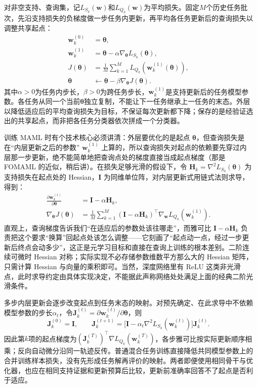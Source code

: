 对非空支持、查询集，记$L_{S_k}(\bm w)$和$L_{Q_k}(\bm w)$为平均损失。固定$M$个历史任务批次，先沿支持损失的负梯度做一步任务内更新，再平均各任务更新后的查询损失以调整共享起点：
\begin{align}
  \bm w_k^{(0)}&=\bm{\theta}, \nonumber\\
  \bm w_k^{(1)}&=\bm{\theta}
       -\alpha\nabla_{\bm{\theta}}L_{S_k}(\bm{\theta}),
       \label{eq:ket-transfer-maml-inner}\\
  J(\bm{\theta})&=\frac{1}{M}\sum_{k=1}^{M}
       L_{Q_k}(\bm w_k^{(1)}(\bm{\theta})), \nonumber\\
  \bm{\theta}&\leftarrow\bm{\theta}-\beta\nabla_{\bm{\theta}}J(\bm{\theta}).
       \label{eq:ket-transfer-maml-outer}
\end{align}
其中$\alpha>0$为任务内步长，$\beta>0$为跨任务步长，$\bm w_k^{(1)}$是支持更新后的任务模型参数。各任务从同一个当前$\bm\theta$独立复制，不能让下一任务继承上一任务的末态。外层以降低适应后的平均查询损失为目标，不保证每次更新都下降；保存的是经验证选出的共享起点，而非把各任务分类器依次拼成一个分类器。

训练 MAML 时有个技术核心必须讲清：外层要优化的是起点 $\bm\theta$，但查询损失是在“内层更新之后的参数” $\bm w_k^{(1)}$ 上算的，所以查询损失对起点的依赖要先穿过内层那一步更新，绝不能简单地把查询点处的梯度直接当成起点梯度（那是 FOMAML 的近似，稍后讲）。在损失足够光滑的假设下，令 $\bm H_k=\nabla^2L_{S_k}(\bm\theta)$ 为支持损失在起点处的 Hessian，$\bm I$ 为同维单位阵，对内层更新式用链式法则求导，得到：
\begin{align}
  \frac{\partial\bm w_k^{(1)}}{\partial\bm{\theta}}
     &=\bm I-\alpha\bm H_k, \nonumber\\
  \nabla_{\bm{\theta}}J(\bm{\theta})
     &=\frac{1}{M}\sum_{k=1}^{M}
       (\bm I-\alpha\bm H_k)^{\top}
       \nabla_{\bm w}L_{Q_k}(\bm w_k^{(1)}).
       \label{eq:ket-transfer-maml-chain}
\end{align}
直观上，查询梯度告诉我们“在适应后的参数处该往哪走”，而雅可比 $\bm I-\alpha\bm H_k$ 负责把这个要求“换算”回起点处该怎么调整——它刻画了“起点动一点，经过一步更新后终点会动多少”，这正是元学习目标和直接在查询上训练的根本差别。二阶连续可微时 Hessian 对称；实际实现不必存储参数维数平方那么大的 Hessian 矩阵，只需计算 Hessian 与向量的乘积即可。当然，深度网络里有 ReLU 这类非光滑点，此时求导约定由具体实现决定，不能据此声称网络处处满足上面的经典二阶光滑条件。

多步内层更新会逐步改变起点到任务末态的映射。对预先确定、在此求导中不依赖模型参数的步长$\alpha_t$，令$\bm J_k^{(t)}=\partial\bm w_k^{(t)}/\partial\bm\theta$，则
\[
  \bm J_k^{(0)}=\bm I,\qquad
  \bm J_k^{(t+1)}
  =\bigl[\bm I-\alpha_t\nabla^2L_{S_k}(\bm w_k^{(t)})\bigr]
    \bm J_k^{(t)}.
\]
因此第$k$项的起点梯度为$(\bm J_k^{(T)})^\top\nabla L_{Q_k}(\bm w_k^{(T)})$，各步雅可比按实际更新顺序相乘；反向自动微分沿同一轨迹反传。普通混合任务训练直接降低共同模型参数上的合并训练样本损失，没有先形成任务解再评价的映射。两者即便使用相同骨干与优化器，也应在相同支持证据和更新预算后比较，更新前准确率回答不了起点是否利于适应。

